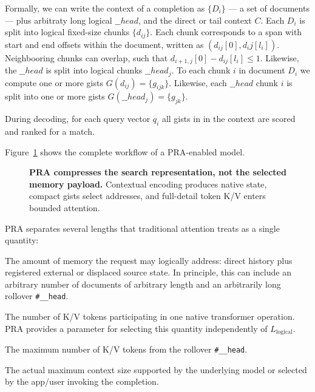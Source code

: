 \documentclass[11pt]{article}
\begin{document}


Formally, we can write the context of a completion as $\{D_i\}$ --- a set of documents ---
plus arbitraty long logical $\_\_head$, and the direct or tail context $C$. 
Each $D_i$ is split into logical fixed-size chunks
$\{d_{ij}\}$. Each chunk corresponds to a span with start and end offsets within the document,
written as $(d_{ij}[0], d_ij[l_i])$. Neighbooring chunks can overlap, such that 
$d_{i+1,j}[0] - d_{ij}[l_i] \le 1$.
Likewise, the $\_\_head$ is split into logical chunks $\_\_head_{j}$.
To each chunk $i$ in document $D_i$ we compute one or more gists $G(d_{ij}) = \{ g_{ijk} \}$. 
Likewise, each $\_\_head$ chunk $i$ is split into one or more gists $G(\_\_head_{j}) = \{ g_{jk} \}$.


During decoding, for each query vector $q_i$ all gists in in the context are scored and ranked for a match.



Figure~\ref{fig:architecture-pipeline} shows the complete workflow of a PRA-enabled model.

\begin{figure}[H]
\centering
\resizebox{\textwidth}{!}{%
%
}
\caption{\textbf{PRA compresses the search representation,
not the selected memory payload.}
Contextual encoding produces native state, compact gists select addresses,
and full-detail
token K/V enters bounded attention.}
\label{fig:architecture-pipeline}
\end{figure}

PRA separates several lengths that traditional attention treats as a single quantity:

\begin{description}[leftmargin=3.2cm,style=nextline]
\item[$L_{\mathrm{logical}}$] The amount of memory the request may logically address: direct
history plus registered external or displaced source state.
In principle, this can include an arbitrary number of documents of arbitrary length
and an arbitrarily long rollover \texttt{\#\_\_head}.
\item[$L_{\mathrm{model\mbox{-}op}}$] The number of K/V tokens participating in one native
transformer operation. PRA provides a parameter for selecting this quantity independently
of $L_{\mathrm{logical}}$.
\item[$L_{\mathrm{max{-}head}}$] The maximum number of K/V tokens from the rollover \texttt{\#\_\_head}.
\item[$L_{\mathrm{max{-}context}}$] The actual maximum context size supported
by the underlying model or selected by the app/user invoking the completion.
\end{description}
\end{document}
